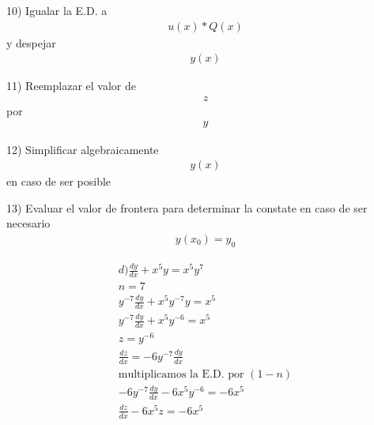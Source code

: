 \documentclass{article}
\begin{document}
10) Igualar la E.D. a 
\begin{gather*}
u(x)*Q(x)
\end{gather*}
 y despejar 
\begin{gather*}
y(x)
\end{gather*}


11) Reemplazar el valor de 
\begin{gather*}
z
\end{gather*}
 por 
\begin{gather*}
y
\end{gather*}


12) Simplificar algebraicamente 
\begin{gather*}
y(x)
\end{gather*}
 en caso de ser posible

13) Evaluar el valor de frontera para determinar la constate en caso de ser necesario 
\begin{gather*}
y(x_{0}) = y_{0}
\end{gather*}





\begin{gather*}
d) \frac{dy}{dx}  + x^{5}y = x^{5}y^{7} \\
n = 7 \\
y^{-7}\frac{dy}{dx}  + x^{5}y^{-7}y = x^{5} \\
y^{-7}\frac{dy}{dx}  + x^{5}y^{-6} = x^{5} \\
z =y^{-6}  \\
\frac{dz}{dx} = -6y^{-7}\frac{dy}{dx} \\
\text{multiplicamos la E.D. por }(1-n) \\
-6y^{-7}\frac{dy}{dx}  -6x^{5}y^{-6} = -6x^{5} \\
\frac{dz}{dx} -6x^{5}z=-6x^{5}
\end{gather*}
\end{document}
